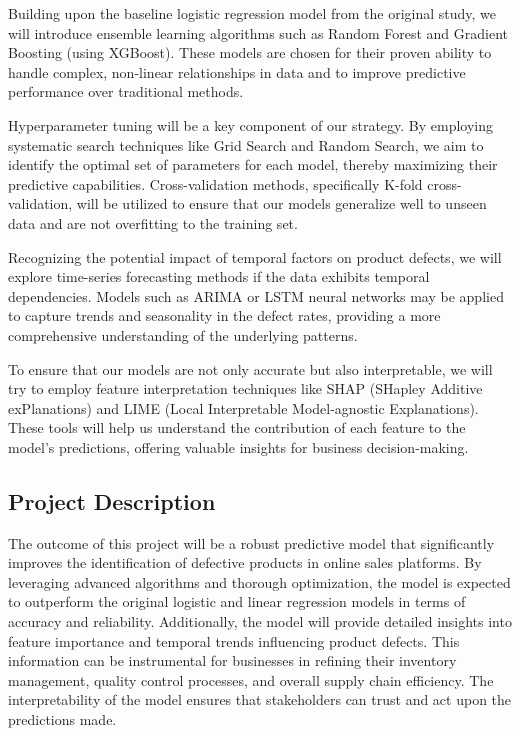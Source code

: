 \documentclass[conference]{IEEEtran}
\begin{document}
Building upon the baseline logistic regression model from the original study, we will introduce ensemble learning algorithms such as Random Forest and Gradient Boosting (using XGBoost). These models are chosen for their proven ability to handle complex, non-linear relationships in data and to improve predictive performance over traditional methods.

Hyperparameter tuning will be a key component of our strategy. By employing systematic search techniques like Grid Search and Random Search, we aim to identify the optimal set of parameters for each model, thereby maximizing their predictive capabilities. Cross-validation methods, specifically K-fold cross-validation, will be utilized to ensure that our models generalize well to unseen data and are not overfitting to the training set.

Recognizing the potential impact of temporal factors on product defects, we will explore time-series forecasting methods if the data exhibits temporal dependencies. Models such as ARIMA or LSTM neural networks may be applied to capture trends and seasonality in the defect rates, providing a more comprehensive understanding of the underlying patterns.

To ensure that our models are not only accurate but also interpretable, we will try to employ feature interpretation techniques like SHAP (SHapley Additive exPlanations) and LIME (Local Interpretable Model-agnostic Explanations). These tools will help us understand the contribution of each feature to the model's predictions, offering valuable insights for business decision-making.

\subsection{Project Description}
The outcome of this project will be a robust predictive model that significantly improves the identification of defective products in online sales platforms. By leveraging advanced algorithms and thorough optimization, the model is expected to outperform the original logistic and linear regression models in terms of accuracy and reliability.
Additionally, the model will provide detailed insights into feature importance and temporal trends influencing product defects. This information can be instrumental for businesses in refining their inventory management, quality control processes, and overall supply chain efficiency. The interpretability of the model ensures that stakeholders can trust and act upon the predictions made.
\end{document}
